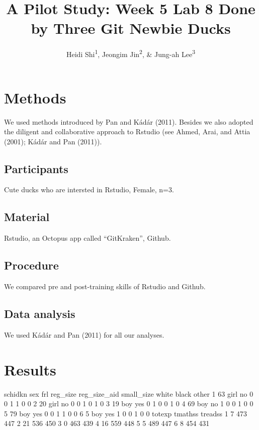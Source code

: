 \documentclass[man]{apa6}
\title{A Pilot Study: Week 5 Lab 8 Done by Three Git Newbie Ducks}
\author{Heidi Shi\textsuperscript{1}, Jeongim Jin\textsuperscript{2}, \& Jung-ah
Lee\textsuperscript{3}}
\date{}
\affiliation{
\vspace{0.5cm}
\textsuperscript{1} University of Oregon\\\textsuperscript{2} University of Oregon\\\textsuperscript{3} University of Oregon}
\begin{document}
\maketitle

\section{Methods}\label{methods}

We used methods introduced by Pan and Kádár (2011). Besides we also
adopted the diligent and collaborative approach to Rstudio (see Ahmed,
Arai, and Attia (2001); Kádár and Pan (2011)).

\subsection{Participants}\label{participants}

Cute ducks who are intersted in Rstudio, Female, n=3.

\subsection{Material}\label{material}

Rstudio, an Octopus app called \enquote{GitKraken}, Github.

\subsection{Procedure}\label{procedure}

We compared pre and post-training skills of Rstudio and Github.

\subsection{Data analysis}\label{data-analysis}

We used Kádár and Pan (2011) for all our analyses.

\section{Results}\label{results}

schidkn sex frl reg\_size reg\_size\_aid small\_size white black other 1
63 girl no 0 0 1 1 0 0 2 20 girl no 0 0 1 0 1 0 3 19 boy yes 0 1 0 0 1 0
4 69 boy no 1 0 0 1 0 0 5 79 boy yes 0 0 1 1 0 0 6 5 boy yes 1 0 0 1 0 0
totexp tmathss treadss 1 7 473 447 2 21 536 450 3 0 463 439 4 16 559 448
5 5 489 447 6 8 454 431
\end{document}
